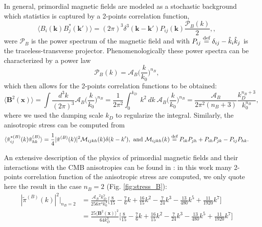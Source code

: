 In general, primordial magnetic fields are modeled as a stochastic background which statistics is captured by a 2-points correlation function,
\begin{equation}
    \langle B_i(\mathbf{k})B^*_j(\mathbf{k'})\rangle=(2\pi)^3\delta^3(\mathbf{k}-\mathbf{k'})P_{ij}(\mathbf{k})\frac{\mathcal P_B(k)}{2},\label{eq:magnetic_2pt},
\end{equation}
were $\mathcal P_B$ is the power spectrum of the magnetic field and with $P_{ij}\stackrel{\text{def}}{=} \delta_{ij} - \hat k_i\hat k_j$ is the traceless-transverse projector.  Phenomenologically these power spectra can be characterized by a power law
$$\mathcal{P}_B(k)=\mathcal A_B\bigg(\frac{k}{k_0}\bigg)^{n_B},$$
which then allows for the 2-points correlation functions to be obtained:
$$\big\langle \mathbf B^2(\mathbf{x})\big\rangle=\int \frac{d^3k}{(2\pi)^3}\mathcal A_B\bigg(\frac{k}{k_0}\bigg)^{n_B}=\frac{1}{2\pi^2}\int_0^{k_D}\ k^2\ dk\ \mathcal A_B\bigg(\frac{k}{k_0}\bigg)^{n_B}=\frac{\mathcal{A}_B }{2\pi^2(n_B+3)}\frac{k_D^{n_B+3}}{k_0^{n_B}},$$
where we used the damping scale $k_D$ to regularize the integral. Similarly, the anisotropic stress can be computed from
$$\langle\tilde\pi^{*(B)}_{ij}(k)\tilde\pi^{(B)}_{hk}\rangle=\frac{1}{4}|\tilde \pi^{(B)}(k)|^2\mathcal{M}_{ijkh}(k)\delta(k-k'),\text{ and }\mathcal{M}_{ijkh}(k)\stackrel{\text{def}}{=} P_{ik}P_{jh}+P_{ih}P_{jk}-P_{ij}P_{hk}.$$

An extensive description of the physics of primordial magnetic fields and their interactions with the CMB anisotropies can be found in \cite{Paoletti_2009}: in this work many 2-points correlation function of the anisotropic stress are computed, we only quote here the result in the case $n_B=2$ (Fig. \ref{fig:stress_B}):
\begin{align*}
    |\tilde \pi^{(B)}(k)|^2\bigg|_{n_B=2}&=\frac{\mathcal{A_B}^2k_D^7}{256\pi^4k_0 ^4}\bigg[\frac{8}{15}-\frac{7}{6}k+\frac{16}{15}k^2-\frac{7}{24}k^3-\frac{13}{480}k^5+\frac{11}{1920}k^7\bigg]\\
    &=\frac{25\big\langle \mathbf B^2(\mathbf{x})\big\rangle^2}{64k_D^3}\bigg[\frac{8}{15}-\frac{7}{6}k+\frac{16}{15}k^2-\frac{7}{24}k^3-\frac{13}{480}k^5+\frac{11}{1920}k^7\bigg]
\end{align*}




